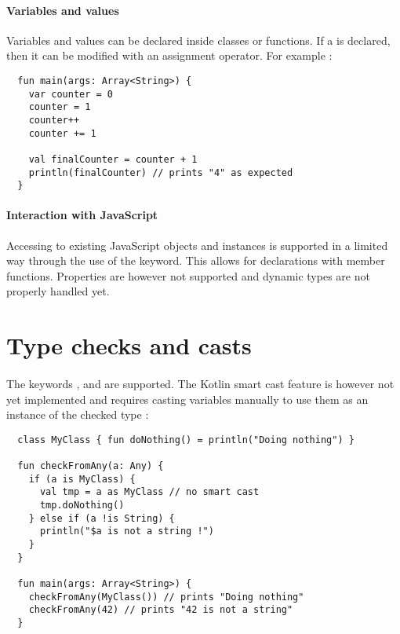 \paragraph{Variables and values} Variables and values can be declared inside 
classes or functions. If a  is declared, then it can be modified with an assignment 
operator. For example :

\begin{verbatim}
  fun main(args: Array<String>) {
    var counter = 0
    counter = 1
    counter++
    counter += 1
    
    val finalCounter = counter + 1
    println(finalCounter) // prints "4" as expected
  }
\end{verbatim}

\paragraph{Interaction with JavaScript} Accessing to existing JavaScript objects and instances is 
supported in a limited way through the use of the  keyword. This allows for 
 declarations with member functions. Properties are however not supported 
and dynamic types are not properly handled yet.


\section{Type checks and casts}
\paragraph{} The keywords ,  and  are supported. The Kotlin 
smart cast feature is however not yet implemented and requires casting variables manually 
to use them as an instance of the checked type :

\begin{verbatim}
  class MyClass { fun doNothing() = println("Doing nothing") }
  
  fun checkFromAny(a: Any) {
    if (a is MyClass) {
      val tmp = a as MyClass // no smart cast
      tmp.doNothing()
    } else if (a !is String) {
      println("$a is not a string !")
    }
  }
  
  fun main(args: Array<String>) {
    checkFromAny(MyClass()) // prints "Doing nothing"
    checkFromAny(42) // prints "42 is not a string"
  }
\end{verbatim}

